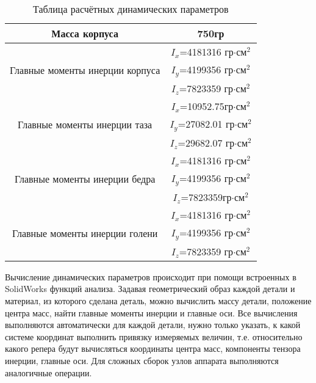 \begin{table}	  	  
\begin{center}
\begin{tabular}{|c|c|}
	\hline
	Масса корпуса & 750гр\\
	\hline
	 \multirow{3}{*}{Главные моменты инерции корпуса} & $I_x$=4181316 гр$\cdot$см$^2$\\ 
	 &$I_y$=4199356 гр$\cdot$см$^2$\\ 
	 & $I_z$=7823359 гр$\cdot$см$^2$\\
	  \hline
	  \multirow{3}{*}{Главные моменты инерции таза}  & $I_x$=10952.75гр$\cdot$см$^2$\\
	  & $I_y$=27082.01 гр$\cdot$см$^2$\\
	  & $I_z$=29682.07 гр$\cdot$см$^2$\\
	  \hline
	 \multirow{3}{*}{Главные моменты инерции бедра} & $I_x$=4181316 гр$\cdot$см$^2$\\ 
	 & $I_y$=4199356 гр$\cdot$см$^2$\\
	 & $I_z$=7823359гр$\cdot$см$^2$\\
	  \hline
	 \multirow{3}{*}{Главные моменты инерции голени} & $I_x$=4181316 гр$\cdot$см$^2$\\
	 & $I_y$=4199356 гр$\cdot$см$^2$\\
	 & $I_z$=7823359 гр$\cdot$см$^2$\\
	  \hline	  
	\end{tabular}
	\label{tab:dinam_par_table}
\end{center}
\caption{Таблица расчётных динамических параметров }
\end{table}

Вычисление динамических параметров происходит при помощи встроенных в SolidWorks функций анализа. Задавая геометрический образ каждой детали и материал, из которого сделана деталь, можно вычислить массу детали, положение центра масс, найти главные моменты инерции и главные оси. Все вычисления выполняются автоматически для каждой детали, нужно только указать, к какой системе координат выполнить привязку измеряемых величин, т.е. относительно какого репера будут вычисляться координаты центра масс, компоненты тензора инерции, главные оси. Для сложных сборок узлов аппарата выполняются аналогичные операции.

